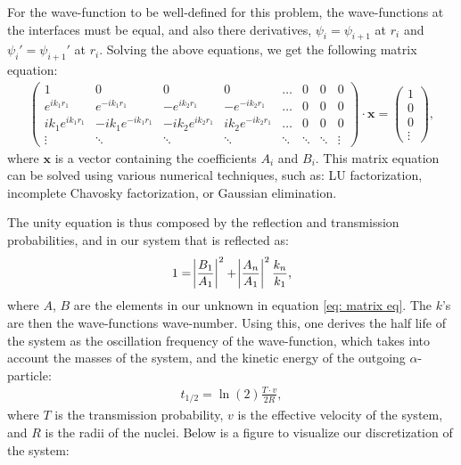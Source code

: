 \documentclass[a4paper]{article}
\newcommand{\newparagraph}{\vspace{.5cm}\noindent}
\begin{document}
For the wave-function to be well-defined for this problem, the wave-functions at the interfaces must be equal, and also there derivatives, $\psi_i = \psi_{i+1}$ at $r_i$ and $\psi_i' = \psi_{i+1}'$ at $r_i$.
Solving the above equations, we get the following matrix equation:
\begin{align}
    \begin{pmatrix}
        1 & 0 & 0 & 0 & \hdots & 0 & 0 & 0\\
        e^{ik_1r_1} & e^{-ik_1r_1} & -e^{ik_2r_1} & -e^{-ik_2r_1}& \hdots & 0 & 0 & 0\\
        ik_1e^{ik_1r_1} & -ik_1e^{-ik_1r_1} & -ik_2e^{ik_2r_1} & ik_2e^{-ik_2r_1} & \hdots & 0 & 0 & 0\\
        \vdots&\ddots&\ddots&\ddots&\ddots&\ddots&\ddots&\vdots
    \end{pmatrix}\cdot\mathbf{x} = \begin{pmatrix}
        1\\
        0\\
        0\\
        \vdots
    \end{pmatrix},\label{eq: matrix eq}
\end{align}where $\mathbf{x}$ is a vector containing the coefficients $A_i$ and $B_i$. This matrix equation can be solved using various numerical techniques, such as:
LU factorization, incomplete Chavosky factorization, or Gaussian elimination.

\newparagraph
The unity equation is thus composed by the reflection and transmission probabilities, and in our system that is reflected as:
\begin{align}
    1 = \abs{\frac{B_1}{A_1}}^2 + \abs{\frac{A_n}{A_1}}^2\frac{k_n}{k_1},\label{eq: transmission_probability}
\end{align}where $A$, $B$ are the elements in our unknown in equation \eqref{eq: matrix eq}. The $k$'s are then the wave-functions wave-number.
Using this, one derives the half life of the system as the oscillation frequency of the wave-function, which takes into account the masses of the system, and the kinetic energy of the outgoing $\alpha$-particle:
\begin{align}
    t_{1/2} = \ln(2)\frac{T\cdot v}{2R},\label{eq: half-life}
\end{align}where $T$ is the transmission probability, $v$ is the effective velocity of the system, and $R$ is the radii of the nuclei\cite{krane1991introductory}. Below is a figure to visualize our discretization of the system:
\end{document}
